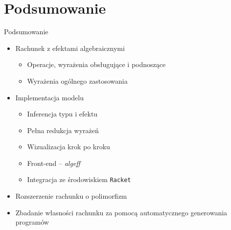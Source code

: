 \documentclass{beamer}
\newcommand{\Racket}{\texttt{Racket}}
\begin{document}


\section{Podsumowanie}
\begin{frame}{Podsumowanie}
  \begin{itemize}
    \item Rachunek z efektami algebraicznymi
    \begin{itemize}
      \item Operacje, wyrażenia obsługujące i podnoszące
      \item Wyrażenia ogólnego zastosowania
    \end{itemize}
    \item Implementacja modelu
    \begin{itemize}
      \item Inferencja typu i efektu
      \item Pełna redukcja wyrażeń
      \item Wizualizacja krok po kroku
      \item Front-end -- \emph{algeff}
      \item Integracja ze środowiskiem \Racket{}
    \end{itemize}
    \item Rozszerzenie rachunku o polimorfizm
    \item Zbadanie własności rachunku za pomocą automatycznego generowania programów
  \end{itemize}
\end{frame}
\end{document}
